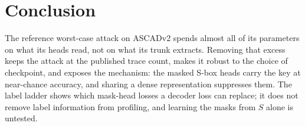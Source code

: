 \section{Conclusion}
\label{sec:conclusion}

The reference worst-case attack on ASCADv2 spends almost all of its parameters on what its heads
read, not on what its trunk extracts. Removing that excess keeps the attack at the published trace
count, makes it robust to the choice of checkpoint, and exposes the mechanism: the masked S-box heads
carry the key at near-chance accuracy, and sharing a dense representation suppresses them. The label
ladder shows which mask-head losses a decoder loss can replace; it does not remove label information
from profiling, and learning the masks from $S$ alone is untested.
